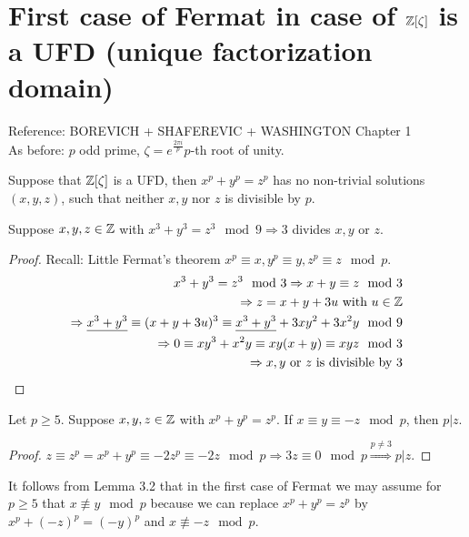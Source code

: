 \section{First case of Fermat in case of $\mathbb{Z}[\zeta]$ is a UFD (unique factorization domain)}
Reference: BOREVICH + SHAFEREVIC + WASHINGTON Chapter 1\\
As before: $p$ odd prime, $\zeta= e^{\frac{2 \pi i}{p}} p$-th root of unity.

\begin{theorem}
Suppose that $\mathbb{Z}[\zeta]$ is a UFD, then $x^p+y^p=z^p$ has no non-trivial solutions $(x,y,z)$, such that neither $x,y$ nor $z$ is divisible by $p$.
\end{theorem}

\addtocounter{theorem}{-1}
\begin{Satz}[$p=3$]
Suppose $x,y,z \in \mathbb{Z}$ with $x^3+y^3=z^3 \mod 9 \Rightarrow 3$ divides $x,y$ or $z$.
\end{Satz}
\begin{proof}
Recall: Little Fermat's theorem $x^p \equiv x, y^p \equiv y, z^p\equiv z \mod p$.
\begin{align*}
x^3+y^3=z^3 \mod 3 \Rightarrow x+y \equiv z \mod 3\\
\Rightarrow z=x+y+3u \text{ with } u \in \mathbb{Z}\\
\Rightarrow \underline{x^3+y^3} \equiv (x+y+3u)^3 \equiv \underline{x^3+y^3}+3xy^2+3x^2y \mod 9\\
\Rightarrow 0 \equiv xy^3+x^2y \equiv xy(x+y) \equiv xyz \mod 3\\
\Rightarrow x,y \text{ or } z \text{ is divisible by } 3
\end{align*}
\end{proof}

\begin{Lem}
Let $p \geq 5$. Suppose $x,y,z \in \mathbb{Z}$ with $x^p+y^p=z^p$. If $x\equiv y \equiv -z \mod p$, then $p | z$.
\end{Lem}
\begin{proof}
$z \equiv z^p = x^p+y^p \equiv -2z^p \equiv -2z \mod p \Rightarrow 3z \equiv 0 \mod p \stackrel{p \neq 3}{\Longrightarrow} p | z$.
\end{proof}

\begin{Bem}
It follows from Lemma 3.2 that in the first case of Fermat we may assume for $p \geq 5$ that $x \not\equiv y \mod p$ because we can replace $x^p + y^p = z^p $ by $x^p+(-z)^p=(-y)^p$ and $x \not\equiv -z \mod p$.
\end{Bem}

